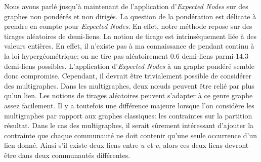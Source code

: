 Nous avons parlé jusqu'à maintenant de l'application d'\emph{Expected Nodes} sur des graphes non pondérés et non dirigés.
La question de la pondération est délicate à prendre en compte pour \emph{Expected Nodes}.
En effet, notre méthode repose sur des tirages aléatoires de demi-liens.
La notion de tirage est intrinsèquement liée à des valeurs entières.
En effet, il n'existe pas à ma connaissance de pendant continu à la loi hypergéométrique;
on ne tire pas aléatoirement $0.6$ demi-liens parmi $14.3$ demi-liens possibles.
L'application d'\emph{Expected Nodes} à un graphe pondéré semble donc compromise.
Cependant, il devrait être trivialement possible de considérer des multigraphes.
Dans les multigraphes, deux n\oe uds peuvent être relié par plus qu'un lien.
Les notions de tirages aléatoires peuvent s'adapter à ce genre graphe assez facilement.
Il y a toutefois une différence majeure lorsque l'on considère les multigraphes par rapport aux graphes classiques: les contraintes sur la partition résultat.
Dans le cas des multigraphes, il serait sûrement intéressant d'ajouter la contrainte que chaque communauté ne doit contenir qu'une seule occurrence d'un lien donné.
Ainsi s'il existe deux liens entre $u$ et $v$, alors ces deux liens devront être dans deux communautés différentes.